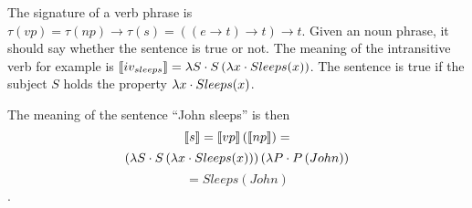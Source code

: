 The signature of a verb phrase is $\tau(vp) = \tau(np) \rightarrow \tau(s) = ((e \rightarrow t) \rightarrow t) \rightarrow t$. Given an noun phrase, it should say whether the sentence is true or not. The meaning of the intransitive verb for example is $\llbracket iv_{sleeps} \rrbracket = \lambda S \cdot S \left( \lambda x \cdot Sleeps(x) \right)$. The sentence is true if the subject $S$ holds the property $\lambda x \cdot Sleeps(x)$.

The meaning of the sentence ``John sleeps'' is then $$\llbracket s \rrbracket = \llbracket vp \rrbracket \left( \llbracket np \rrbracket \right) =$$ $$ \left( \lambda S \cdot S \left( \lambda x \cdot Sleeps(x) \right) \right) \left( \lambda P \cdot P \left( John \right) \right)$$ $$= Sleeps(John)$$.



